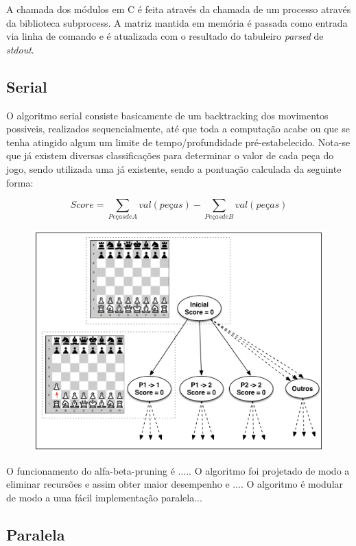 \documentclass[12pt,a4paper,final]{article}
\begin{document}
A chamada dos módulos em C é feita através da chamada de um processo através da biblioteca subprocess. A matriz mantida em memória é passada como entrada via linha de comando e é atualizada com o resultado do tabuleiro \textit{parsed} de \textit{stdout}.

\subsection{Serial}

O algoritmo serial consiste basicamente de um backtracking dos movimentos possiveis, realizados sequencialmente, até que toda a computação acabe ou que se tenha atingido algum um limite de tempo/profundidade pré-estabelecido. Nota-se que já existem diversas classificações para determinar o valor de cada peça do jogo, sendo utilizada uma já existente, sendo a pontuação calculada da seguinte forma:

\begin{equation}
Score = \sum_{Peças de A} val(peças) - \sum_{Peças de B} val(peças)
\end{equation}

\begin{figure}[H]
\centering
\includegraphics[scale=1]{chess.png}
\end{figure}

O funcionamento do alfa-beta-pruning é .....
O algoritmo foi projetado de modo a eliminar recursões e assim obter maior desempenho e ....
O algoritmo é modular de modo a uma fácil implementação paralela...

\subsection{Paralela}
\end{document}
